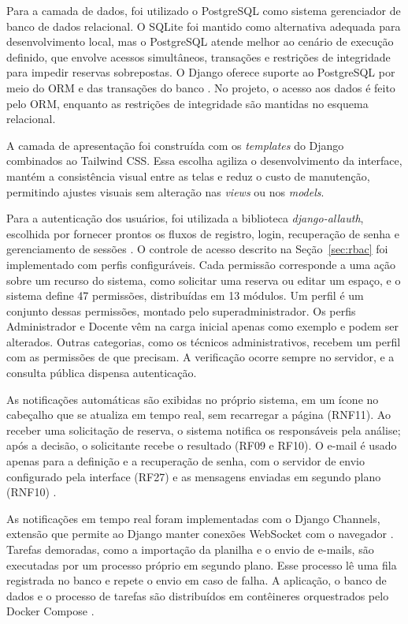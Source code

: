 \documentclass[
	12pt,				%
	twoside,			%
	openany,			%
	a4paper,			%
	chapter=TITLE,		%
	section=TITLE,		%
	subsection=TITLE,	%
	subsubsection=TITLE,%
	english,			%
	french,				%
	spanish,			%
	brazil,				%
	]{abntex2}
\begin{document}
Para a camada de dados, foi utilizado o PostgreSQL como sistema gerenciador de banco de dados relacional. O SQLite foi mantido como alternativa adequada para desenvolvimento local, mas o PostgreSQL atende melhor ao cenário de execução definido, que envolve acessos simultâneos, transações e restrições de integridade para impedir reservas sobrepostas. O Django oferece suporte ao PostgreSQL por meio do ORM e das transações do banco \cite{djangodocs}. No projeto, o acesso aos dados é feito pelo ORM, enquanto as restrições de integridade são mantidas no esquema relacional.

A camada de apresentação foi construída com os \textit{templates} do Django combinados ao Tailwind CSS. Essa escolha agiliza o desenvolvimento da interface, mantém a consistência visual entre as telas e reduz o custo de manutenção, permitindo ajustes visuais sem alteração nas \textit{views} ou nos \textit{models}.

Para a autenticação dos usuários, foi utilizada a biblioteca \textit{django-allauth}, escolhida por fornecer prontos os fluxos de registro, login, recuperação de senha e gerenciamento de sessões \cite{pennersr2024}. O controle de acesso descrito na Seção~\ref{sec:rbac} foi implementado com perfis configuráveis. Cada permissão corresponde a uma ação sobre um recurso do sistema, como solicitar uma reserva ou editar um espaço, e o sistema define 47 permissões, distribuídas em 13 módulos. Um perfil é um conjunto dessas permissões, montado pelo superadministrador. Os perfis Administrador e Docente vêm na carga inicial apenas como exemplo e podem ser alterados. Outras categorias, como os técnicos administrativos, recebem um perfil com as permissões de que precisam. A verificação ocorre sempre no servidor, e a consulta pública dispensa autenticação.

As notificações automáticas são exibidas no próprio sistema, em um ícone no cabeçalho que se atualiza em tempo real, sem recarregar a página (RNF11). Ao receber uma solicitação de reserva, o sistema notifica os responsáveis pela análise; após a decisão, o solicitante recebe o resultado (RF09 e RF10). O e-mail é usado apenas para a definição e a recuperação de senha, com o servidor de envio configurado pela interface (RF27) e as mensagens enviadas em segundo plano (RNF10) \cite{djangodocs}.

As notificações em tempo real foram implementadas com o Django Channels, extensão que permite ao Django manter conexões WebSocket com o navegador \cite{channelsdocs}. Tarefas demoradas, como a importação da planilha e o envio de e-mails, são executadas por um processo próprio em segundo plano. Esse processo lê uma fila registrada no banco e repete o envio em caso de falha. A aplicação, o banco de dados e o processo de tarefas são distribuídos em contêineres orquestrados pelo Docker Compose \cite{dockerdocs}.
\end{document}

